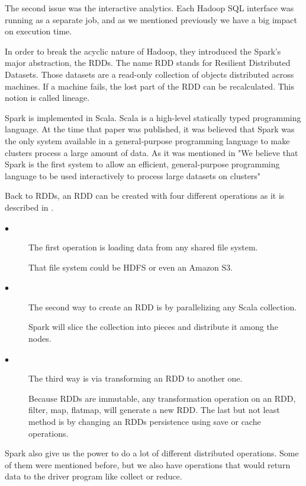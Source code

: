 The second issue was the interactive analytics. Each Hadoop SQL interface was running as a separate job, and as we mentioned previously we have a big impact on execution time.

In order to break the acyclic nature of Hadoop, they introduced the Spark's major abstraction, the RDDs. The name RDD stands for Resilient Distributed Datasets. Those datasets are a read-only collection of objects distributed across machines. If a machine fails, the lost part of the RDD can be recalculated. This notion is called lineage.

Spark is implemented in Scala. Scala is a high-level statically typed programming language. At the time that paper was published, it was believed that Spark was the only system available in a general-purpose programming language to make clusters process a large amount of data. As it was mentioned in \cite{Zaharia:2010:SCC:1863103.1863113} "We believe that Spark is the first system to allow an efficient, general-purpose programming language to be used interactively to process large datasets on clusters"

Back to RDDs, an RDD can be created with four different operations as it is described in \cite{Zaharia:2010:SCC:1863103.1863113}.

\begin{description}
	\item[$\bullet$] The first operation is loading data from any shared file system. 
	
	That file system could be HDFS or even an Amazon S3. 
	\item[$\bullet$] The second way to create an RDD is by parallelizing any Scala collection. 
	
	Spark will slice the collection into pieces and distribute it among the nodes.
	\item[$\bullet$] The third way is via transforming an RDD to another one. 
	
	Because RDDs are immutable, any transformation operation on an RDD, filter, map, flatmap, will generate a new RDD. The last but not least method is by changing an RDDs persistence using save or cache operations.
\end{description}


Spark also give us the power to do a lot of different distributed operations. Some of them were mentioned before, but we also have operations that would return data to the driver program like collect or reduce. 

